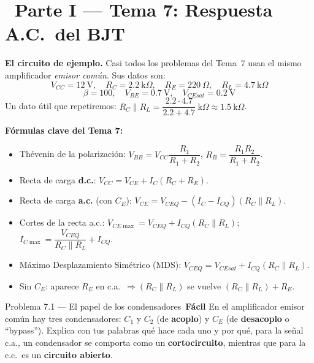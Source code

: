 \documentclass[11pt,a4paper]{article}
\newcommand{\iconotexto}[2]{\textcolor{cyanNeon}{\faIcon{#1}}~#2}
\newcommand{\facil}{\textcolor{verdeSignal}{\faIcon{circle}\,\textbf{Fácil}}}
\begin{document}
\section{\iconotexto{wave-square}{Parte I --- Tema 7: Respuesta A.C.\ del BJT}}

\begin{cajaConcepto}
\textbf{El circuito de ejemplo.} Casi todos los problemas del Tema~7 usan el mismo amplificador \emph{emisor común}. Sus datos son:
\[
V_{CC}=12\ \text{V},\quad R_C=2.2\ \text{k}\Omega,\quad R_E=220\ \Omega,\quad R_L=4.7\ \text{k}\Omega
\]
\[
\beta=100,\quad V_{BE}=0.7\ \text{V},\quad V_{CEsat}=0.2\ \text{V}
\]
Un dato útil que repetiremos: $R_C \parallel R_L = \dfrac{2.2\cdot 4.7}{2.2+4.7}\ \text{k}\Omega \approx 1.5\ \text{k}\Omega$.
\end{cajaConcepto}

\begin{cajaRecuerda}
\textbf{Fórmulas clave del Tema 7:}
\begin{itemize}[leftmargin=1.2em,itemsep=2pt]
  \item Thévenin de la polarización: $V_{BB}=V_{CC}\dfrac{R_1}{R_1+R_2}$, \quad $R_B=\dfrac{R_1 R_2}{R_1+R_2}$.
  \item Recta de carga \textbf{d.c.}: $V_{CC}=V_{CE}+I_C(R_C+R_E)$.
  \item Recta de carga \textbf{a.c.} (con $C_E$): $V_{CE}=V_{CEQ}-(I_C-I_{CQ})(R_C\parallel R_L)$.
  \item Cortes de la recta a.c.: $V_{CE\max}=V_{CEQ}+I_{CQ}(R_C\parallel R_L)$; \ $I_{C\max}=\dfrac{V_{CEQ}}{R_C\parallel R_L}+I_{CQ}$.
  \item Máximo Desplazamiento Simétrico (MDS): $V_{CEQ}=V_{CEsat}+I_{CQ}(R_C\parallel R_L)$.
  \item Sin $C_E$: aparece $R_E$ en c.a.\ $\Rightarrow (R_C\parallel R_L)$ se vuelve $(R_C\parallel R_L)+R_E$.
\end{itemize}
\end{cajaRecuerda}

\begin{problemaBox}{Problema 7.1 --- El papel de los condensadores \quad \facil}
En el amplificador emisor común hay tres condensadores: $C_1$ y $C_2$ (de \textbf{acoplo}) y $C_E$ (de \textbf{desacoplo} o ``bypass''). Explica con tus palabras qué hace cada uno y por qué, para la señal c.a., un condensador se comporta como un \textbf{cortocircuito}, mientras que para la c.c.\ es un \textbf{circuito abierto}.
\end{problemaBox}
\end{document}
